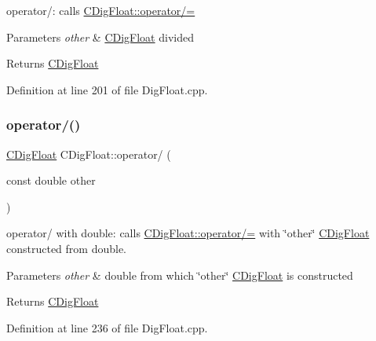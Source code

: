 operator/\+: calls \hyperlink{classCDigFloat_a53d3939dfc89d172f1bf803a46bc3369}{C\+Dig\+Float\+::operator/=} 


\begin{DoxyParams}{Parameters}
{\em other} & \hyperlink{classCDigFloat}{C\+Dig\+Float} divided \\
\hline
\end{DoxyParams}
\begin{DoxyReturn}{Returns}
\hyperlink{classCDigFloat}{C\+Dig\+Float} 
\end{DoxyReturn}


Definition at line 201 of file Dig\+Float.\+cpp.

\mbox{\label{classCDigFloat_a4e9cc3b14f2b5a6d704957fb1a8de1a2}} 
\subsubsection{\texorpdfstring{operator/()}{operator/()}\hspace{0.1cm}{\footnotesize\ttfamily [2/2]}}
{\footnotesize\ttfamily \hyperlink{classCDigFloat}{C\+Dig\+Float} C\+Dig\+Float\+::operator/ (\begin{DoxyParamCaption}\item[{const double}]{other }\end{DoxyParamCaption})}



operator/ with double\+: calls \hyperlink{classCDigFloat_a53d3939dfc89d172f1bf803a46bc3369}{C\+Dig\+Float\+::operator/=} with \char`\"{}other\char`\"{} \hyperlink{classCDigFloat}{C\+Dig\+Float} constructed from double. 


\begin{DoxyParams}{Parameters}
{\em other} & double from which \char`\"{}other\char`\"{} \hyperlink{classCDigFloat}{C\+Dig\+Float} is constructed \\
\hline
\end{DoxyParams}
\begin{DoxyReturn}{Returns}
\hyperlink{classCDigFloat}{C\+Dig\+Float} 
\end{DoxyReturn}


Definition at line 236 of file Dig\+Float.\+cpp.

\mbox{\label{classCDigFloat_a53d3939dfc89d172f1bf803a46bc3369}} 
